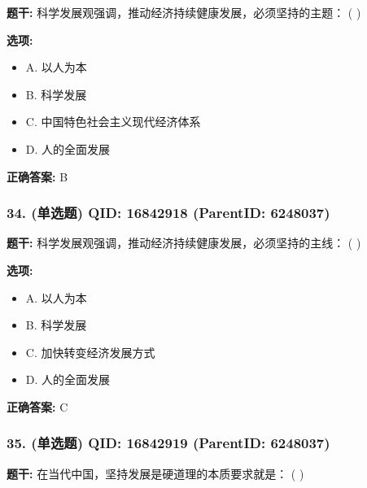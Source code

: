 \documentclass[12pt,UTF8]{ctexart}
\begin{document}
\textbf{题干:}
科学发展观强调，推动经济持续健康发展，必须坚持的主题： ( )



\textbf{选项:}
\begin{itemize}[leftmargin=*]

  \item A. 以人为本

  \item B. 科学发展

  \item C. 中国特色社会主义现代经济体系

  \item D. 人的全面发展

\end{itemize}

\textbf{正确答案:}
B

\vspace{0.3em}\hrulefill\vspace{0.7em}

\subsubsection*{34. (单选题) \small QID: 16842918 (ParentID: 6248037)}

\textbf{题干:}
科学发展观强调，推动经济持续健康发展，必须坚持的主线： ( )



\textbf{选项:}
\begin{itemize}[leftmargin=*]

  \item A. 以人为本

  \item B. 科学发展

  \item C. 加快转变经济发展方式

  \item D. 人的全面发展

\end{itemize}

\textbf{正确答案:}
C

\vspace{0.3em}\hrulefill\vspace{0.7em}

\subsubsection*{35. (单选题) \small QID: 16842919 (ParentID: 6248037)}

\textbf{题干:}
在当代中国，坚持发展是硬道理的本质要求就是： ( )
\end{document}
